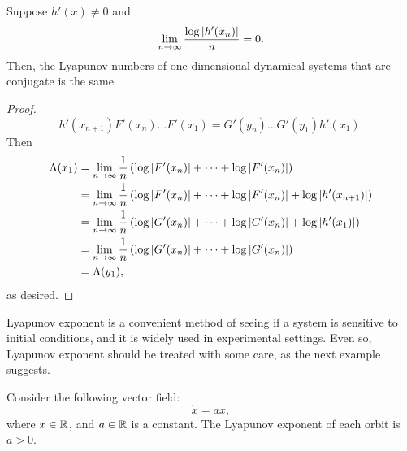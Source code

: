 \documentclass[10pt,twoside,draft]{book}
\begin{document}
\begin{proposition}
  Suppose $h'(x) \neq 0$ and
  \begin{equation*}
    \lim\limits_{n\to \infty} \frac{\log\left | h'(x_n) \right |}{n} = 0.
  \end{equation*}
  Then, the Lyapunov numbers of one-dimensional dynamical systems that are conjugate is the same 
  \label{prop:lyap-conj}
  \begin{proof}
    \begin{equation*}
      h'(x_{n+1})F'(x_n)\ldots F'(x_1) = G'(y_n)\ldots G'(y_1)h'(x_1).
    \end{equation*}
    Then 
    \begin{align*}
      \Lambda(x_1) &= \lim\limits_{n\to \infty} \frac{1}{n}\left ( \log\left | F'(x_n) \right | + \cdots + \log\left | F'(x_n) \right |  \right ) \\
      &= \lim\limits_{n\to \infty} \frac{1}{n}\left(\log\left | F'(x_n) \right | + \cdots + \log\left | F'(x_n) \right | + \log\left | h'(x_{n+1}) \right |\right) \\
      &= \lim\limits_{n\to \infty} \frac{1}{n} \left (  \log\left | G'(x_n) \right | + \cdots + \log\left | G'(x_n) \right | + \log\left | h'(x_1) \right |  \right ) \\
      &= \lim\limits_{n\to \infty} \frac{1}{n} \left (  \log\left | G'(x_n) \right | + \cdots + \log\left | G'(x_n) \right |  \right ) \\
      &= \Lambda(y_1),
    \end{align*} 
    as desired.
  \end{proof}
\end{proposition}
Lyapunov exponent is a convenient method of seeing if a system is sensitive to initial conditions, and it is widely used in experimental settings.
Even so, Lyapunov exponent should be treated with some care, as the next example suggests.
\begin{example}
  \citep{wiggins}
  Consider the following vector field:
  \begin{equation*}
    \dot{x} = ax,
  \end{equation*}
  where $x \in \mathbb{R}$, and $a \in \mathbb{R}$ is a constant.
  The Lyapunov exponent of each orbit is $a > 0$.
\end{example}


\end{document}
